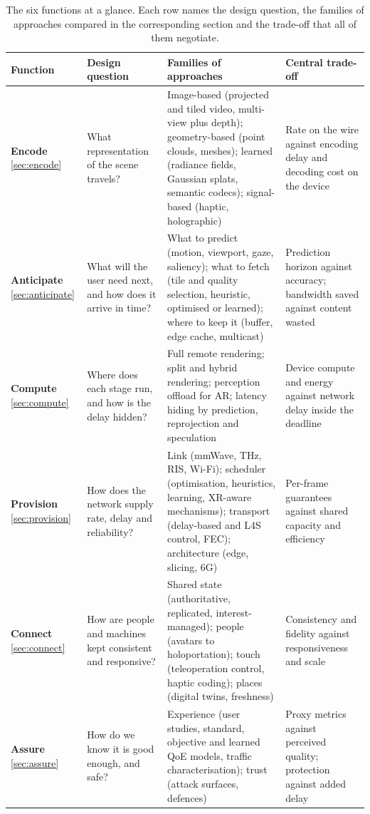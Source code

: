 \begin{table}[t]
\centering\small
\caption{The six functions at a glance. Each row names the design question, the families of approaches
compared in the corresponding section and the trade-off that all of them negotiate.}\label{tab:framework}
\setlength{\tabcolsep}{4pt}
\renewcommand{\arraystretch}{1.12}
\begin{tabularx}{\linewidth}{@{}>{\raggedright\arraybackslash}p{1.55cm}>{\raggedright\arraybackslash}p{3.7cm}>{\raggedright\arraybackslash}X>{\raggedright\arraybackslash}p{3.7cm}@{}}
\toprule
Function & Design question & Families of approaches & Central trade-off\\
\midrule
\textcolor{encode!80!black}{\textbf{Encode}} \cref{sec:encode} & What representation of the scene travels? & Image-based (projected and tiled video, multi-view plus depth); geometry-based (point clouds, meshes); learned (radiance fields, Gaussian splats, semantic codecs); signal-based (haptic, holographic) & Rate on the wire against encoding delay and decoding cost on the device\\
\textcolor{anticipate!80!black}{\textbf{Anticipate}} \cref{sec:anticipate} & What will the user need next, and how does it arrive in time? & What to predict (motion, viewport, gaze, saliency); what to fetch (tile and quality selection, heuristic, optimised or learned); where to keep it (buffer, edge cache, multicast) & Prediction horizon against accuracy; bandwidth saved against content wasted\\
\textcolor{compute!70!black}{\textbf{Compute}} \cref{sec:compute} & Where does each stage run, and how is the delay hidden? & Full remote rendering; split and hybrid rendering; perception offload for AR; latency hiding by prediction, reprojection and speculation & Device compute and energy against network delay inside the deadline\\
\textcolor{provision!80!black}{\textbf{Provision}} \cref{sec:provision} & How does the network supply rate, delay and reliability? & Link (mmWave, THz, RIS, Wi-Fi); scheduler (optimisation, heuristics, learning, XR-aware mechanisms); transport (delay-based and L4S control, FEC); architecture (edge, slicing, 6G) & Per-frame guarantees against shared capacity and efficiency\\
\textcolor{connect!80!black}{\textbf{Connect}} \cref{sec:connect} & How are people and machines kept consistent and responsive? & Shared state (authoritative, replicated, interest-managed); people (avatars to holoportation); touch (teleoperation control, haptic coding); places (digital twins, freshness) & Consistency and fidelity against responsiveness and scale\\
\textcolor{assure!80!black}{\textbf{Assure}} \cref{sec:assure} & How do we know it is good enough, and safe? & Experience (user studies, standard, objective and learned QoE models, traffic characterisation); trust (attack surfaces, defences) & Proxy metrics against perceived quality; protection against added delay\\
\bottomrule
\end{tabularx}
\end{table}
